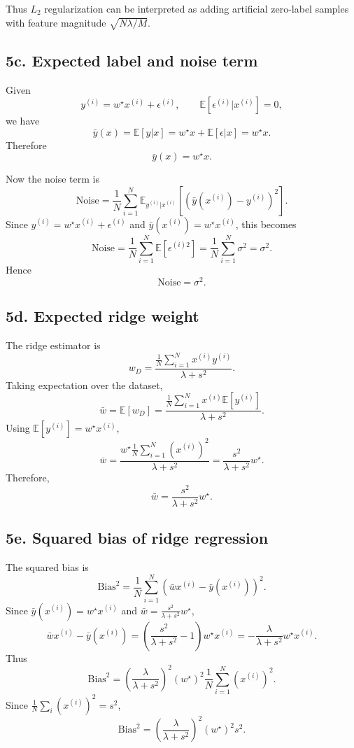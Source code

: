 \documentclass[11pt]{article}
\begin{document}
Thus $L_2$ regularization can be interpreted as adding artificial zero-label samples with feature magnitude $\sqrt{N\lambda/M}$.

\subsection*{5c. Expected label and noise term}

Given
\[
 y^{(i)} = w^\star x^{(i)} + \epsilon^{(i)},
\qquad \mathbb{E}[\epsilon^{(i)}|x^{(i)}]=0,
\]
we have
\[
\bar y(x) = \mathbb{E}[y|x] = w^\star x + \mathbb{E}[\epsilon|x] = w^\star x.
\]
Therefore
\[
\boxed{\bar y(x)=w^\star x.}
\]

Now the noise term is
\[
\text{Noise} = \frac1N\sum_{i=1}^N \mathbb{E}_{y^{(i)}|x^{(i)}}[(\bar y(x^{(i)})-y^{(i)})^2].
\]
Since $y^{(i)}=w^\star x^{(i)}+\epsilon^{(i)}$ and $\bar y(x^{(i)})=w^\star x^{(i)}$, this becomes
\[
\text{Noise} = \frac1N\sum_{i=1}^N \mathbb{E}[\epsilon^{(i)2}] = \frac1N\sum_{i=1}^N \sigma^2 = \sigma^2.
\]
Hence
\[
\boxed{\text{Noise}=\sigma^2.}
\]

\subsection*{5d. Expected ridge weight}

The ridge estimator is
\[
 w_D = \frac{\frac1N\sum_{i=1}^N x^{(i)}y^{(i)}}{\lambda+s^2}.
\]
Taking expectation over the dataset,
\[
\bar w = \mathbb{E}[w_D] = \frac{\frac1N\sum_{i=1}^N x^{(i)}\mathbb{E}[y^{(i)}]}{\lambda+s^2}.
\]
Using $\mathbb{E}[y^{(i)}]=w^\star x^{(i)}$,
\[
\bar w = \frac{w^\star \frac1N\sum_{i=1}^N (x^{(i)})^2}{\lambda+s^2}
= \frac{s^2}{\lambda+s^2}w^\star.
\]
Therefore,
\[
\boxed{\bar w = \frac{s^2}{\lambda+s^2}w^\star.}
\]

\subsection*{5e. Squared bias of ridge regression}

The squared bias is
\[
\text{Bias}^2 = \frac1N\sum_{i=1}^N (\bar w x^{(i)} - \bar y(x^{(i)}))^2.
\]
Since $\bar y(x^{(i)}) = w^\star x^{(i)}$ and $\bar w = \frac{s^2}{\lambda+s^2}w^\star$,
\[
\bar w x^{(i)} - \bar y(x^{(i)}) = \left(\frac{s^2}{\lambda+s^2}-1\right)w^\star x^{(i)} = -\frac{\lambda}{\lambda+s^2}w^\star x^{(i)}.
\]
Thus
\[
\text{Bias}^2 = \left(\frac{\lambda}{\lambda+s^2}\right)^2 (w^\star)^2 \frac1N\sum_{i=1}^N (x^{(i)})^2.
\]
Since $\frac1N\sum_i (x^{(i)})^2=s^2$,
\[
\boxed{\text{Bias}^2 = \left(\frac{\lambda}{\lambda+s^2}\right)^2 (w^\star)^2 s^2.}
\]
\end{document}
